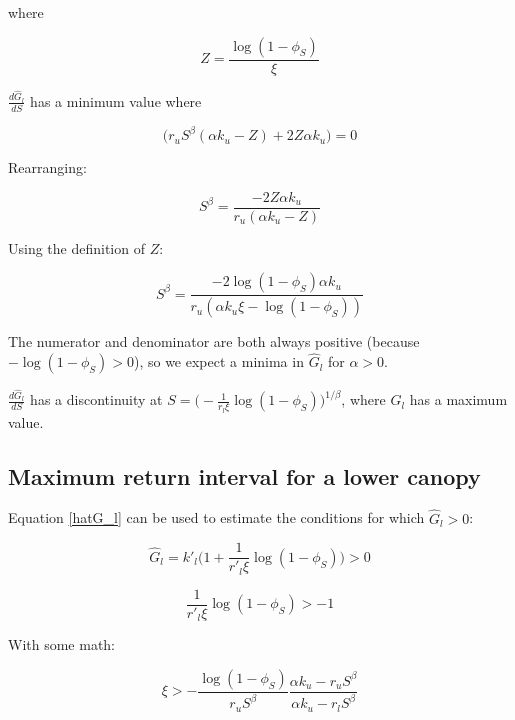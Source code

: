 \documentclass[12pt]{article}
\begin{document}
where

\begin{equation}
Z = \frac{\log({1-\phi_S})}{\xi}
\end{equation}

 $\frac{d \hat{G}_l}{dS}$  has a minimum value where 
  
  \begin{equation}
  \big( {r_u} S^{\beta }(\alpha  {k_u}  - Z) +2 Z \alpha  {k_u} 
   \big) = 0
\end{equation}

Rearranging:

  \begin{equation}
 S^{\beta } = \frac{-2 Z \alpha  {k_u} }{{r_u}(\alpha  {k_u}  - Z)  }
\end{equation}

Using the definition of $Z$:

  \begin{equation}
 S^{\beta } = \frac{-2 {\log({1-\phi_S})} \alpha  {k_u} }{{r_u}(\alpha  {k_u} \xi - {\log({1-\phi_S})})  }
\end{equation}

The numerator and denominator are both always positive (because $- \log(1-\phi_S) > 0$), so we expect a minima in $\hat G_l$ for $\alpha > 0$.

 $\frac{d \hat{G}_l}{dS}$ has a discontinuity at  $ S = \big( - \frac{1}{r_l \xi }\log (1 - \phi_S)\big)^{1/\beta}$, where $G_l$ has a maximum value.   


\subsection*{Maximum return interval for a lower canopy}

Equation \ref{hatG_l} can be used to estimate the conditions for which $\hat G_l >0$:

\begin{equation}
\hat{G}_l =
 		k'_l \big( 1 + \frac{1}{r'_l \xi} \log(1-\phi_S) \big) > 0
\end{equation}


\begin{equation}
 		\frac{1}{r'_l \xi} \log(1-\phi_S) > -1
\end{equation}

With some math:

\begin{equation}
 	\xi > - \frac{\log(1-\phi_S)}{r_u S^\beta} \frac{\alpha k_u - r_u S^\beta}{\alpha k_u - r_l S^\beta}
\end{equation} 
\end{document}
